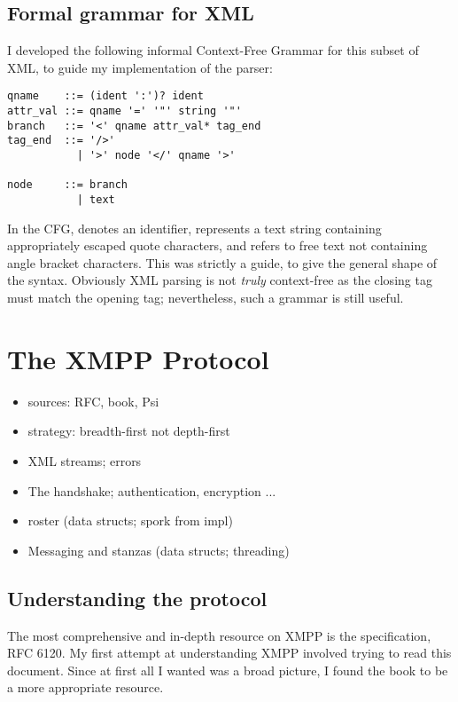 \subsection{Formal grammar for XML}
I developed the following informal Context-Free Grammar for this subset of XML, to guide my implementation of the parser:

\begin{lstlisting}
qname    ::= (ident ':')? ident
attr_val ::= qname '=' '"' string '"'
branch   ::= '<' qname attr_val* tag_end
tag_end  ::= '/>'
           | '>' node '</' qname '>'

node     ::= branch
           | text

\end{lstlisting}
In the CFG,  denotes an identifier,  represents a text string containing appropriately escaped quote characters, and  refers to free text not containing angle bracket characters. This was strictly a guide, to give the general shape of the syntax. Obviously XML parsing is not \emph{truly} context-free as the closing tag must match the opening tag; nevertheless, such a grammar is still useful.

\section{The XMPP Protocol}
\begin{itemize}
  \item sources: RFC, book, Psi
  \item strategy: breadth-first not depth-first
  \item XML streams; errors
  \item The handshake; authentication, encryption ...
  \item roster (data structs; spork from impl)
  \item Messaging and stanzas (data structs; threading)
\end{itemize}
\subsection{Understanding the protocol}
The most comprehensive and in-depth resource on XMPP is the specification, RFC 6120. My first attempt at understanding XMPP involved trying to read this document. Since at first all I wanted was a broad picture, I found the book  to be a more appropriate resource.

